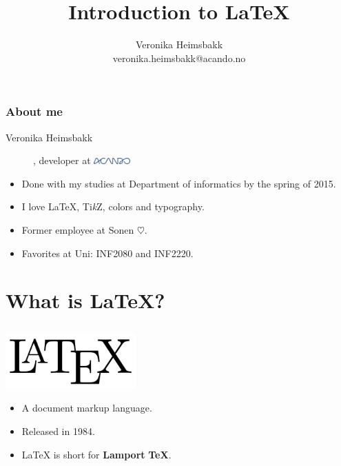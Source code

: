 \documentclass[10pt]{beamer}
\title{Introduction to \LaTeX{}}
\author{Veronika Heimsbakk\\veronika.heimsbakk@acando.no}
\date{}
\begin{document}
\begin{frame}\frametitle{}
\maketitle
\end{frame}

\begin{frame}\frametitle{About me}
\begin{description}
\item[Veronika Heimsbakk], developer at \includegraphics[width=1.4cm]{img/acandologo.png}
\end{description}

\begin{itemize}
	\item
	Done with my studies at Department of informatics by the spring of 2015.
	\item
	I love \LaTeX{}, Ti\textit{k}Z, colors and typography.
	\item
	Former employee at Sonen $\heartsuit$.
	\item
	Favorites at Uni: INF2080 and INF2220.
\end{itemize}
\end{frame}

\section{What is \LaTeX{}?}
\subsection{}
\begin{frame}\frametitle{}

\begin{center}
\includegraphics[width=5cm]{img/latexlogo.png}
\end{center}

\begin{itemize}
	\item
	A document markup language.
	\item
	Released in 1984.
	\item
	\LaTeX{} is short for \textbf{Lamport} \textbf{\TeX}.
\end{itemize}
\end{frame}
\end{document}
